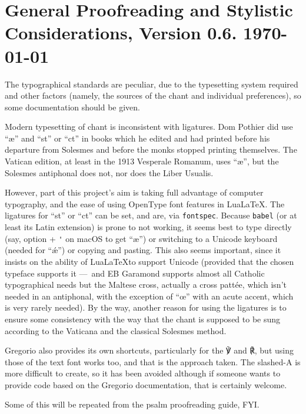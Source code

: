 \documentclass[11pt]{article}
\begin{document}
\section{General Proofreading and Stylistic Considerations, Version 0.6. \today}

The typographical standards are peculiar, due to the typesetting system required and other factors (namely, the sources of the chant and individual preferences), so some documentation should be given.

Modern typesetting of chant is inconsistent with ligatures. Dom Pothier did use ``æ'' and ``st'' or ``ct'' in books which he edited and had printed before his departure from Solesmes and before the monks stopped printing themselves. The Vatican edition, at least in the 1913 Vesperale Romanum, uses ``æ'', but the Solesmes antiphonal does not, nor does the Liber Usualis.

However, part of this project's aim is taking full advantage of computer typography, and the ease of using OpenType font features in Lua\LaTeX. The ligatures for ``st'' or ``ct'' can be set, and are, via \verb|fontspec|. Because \verb|babel| (or at least its Latin extension) is prone to not working, it seems best to type directly (say, option + \verb|'| on macOS to get ``æ'') or switching to a Unicode keyboard (needed for ``ǽ'') or copying and pasting. This also seems important, since it insists on the ability of Lua\LaTeX to support Unicode (provided that the chosen typeface supports it — and EB Garamond supports almost all Catholic typographical needs but the Maltese cross, actually a cross pattée, which isn't needed in an antiphonal, with the exception of ``œ'' with an acute accent, which is very rarely needed). By the way, another reason for using the ligatures is to ensure some consistency with the way that the chant is supposed to be sung according to the Vaticana and the classical Solesmes method.

Gregorio also provides its own shortcuts, particularly for the ℣ and ℟, but using those of the text font works too, and that is the approach taken. The slashed-A is more difficult to create, so it has been avoided although if someone wants to provide code based on the Gregorio documentation, that is certainly welcome.

Some of this will be repeated from the psalm proofreading guide, FYI. 
\end{document}
